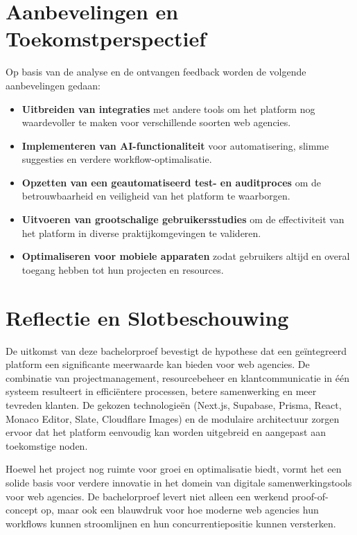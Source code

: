 \section{Aanbevelingen en Toekomstperspectief}

Op basis van de analyse en de ontvangen feedback worden de volgende aanbevelingen gedaan:
\begin{itemize}
    \item \textbf{Uitbreiden van integraties} met andere tools om het platform nog waardevoller te maken voor verschillende soorten web agencies.
    \item \textbf{Implementeren van AI-functionaliteit} voor automatisering, slimme suggesties en verdere workflow-optimalisatie.
    \item \textbf{Opzetten van een geautomatiseerd test- en auditproces} om de betrouwbaarheid en veiligheid van het platform te waarborgen.
    \item \textbf{Uitvoeren van grootschalige gebruikersstudies} om de effectiviteit van het platform in diverse praktijkomgevingen te valideren.
    \item \textbf{Optimaliseren voor mobiele apparaten} zodat gebruikers altijd en overal toegang hebben tot hun projecten en resources.
\end{itemize}

\section{Reflectie en Slotbeschouwing}

De uitkomst van deze bachelorproef bevestigt de hypothese dat een geïntegreerd platform een significante meerwaarde kan bieden voor web agencies. De combinatie van projectmanagement, resourcebeheer en klantcommunicatie in één systeem resulteert in efficiëntere processen, betere samenwerking en meer tevreden klanten. De gekozen technologieën (Next.js, Supabase, Prisma, React, Monaco Editor, Slate, Cloudflare Images) en de modulaire architectuur zorgen ervoor dat het platform eenvoudig kan worden uitgebreid en aangepast aan toekomstige noden.

Hoewel het project nog ruimte voor groei en optimalisatie biedt, vormt het een solide basis voor verdere innovatie in het domein van digitale samenwerkingstools voor web agencies. De bachelorproef levert niet alleen een werkend proof-of-concept op, maar ook een blauwdruk voor hoe moderne web agencies hun workflows kunnen stroomlijnen en hun concurrentiepositie kunnen versterken.


